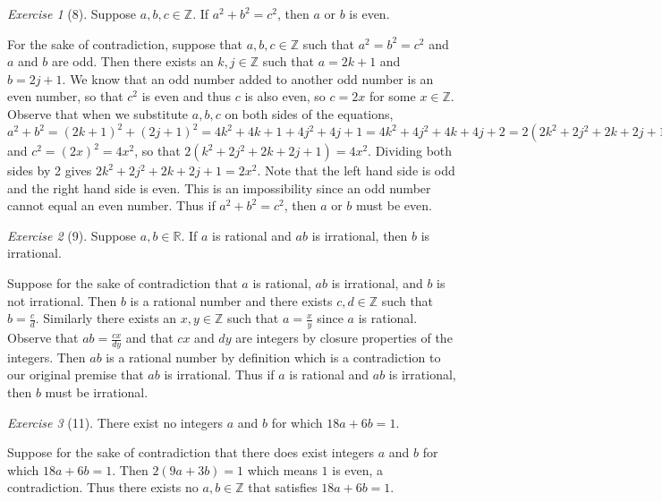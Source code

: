\documentclass[12pt]{amsart}
\makeatletter
\theoremstyle{remark}
\newtheorem*{exercise}{Exercise}%
\def\RR{\ensuremath{\mathbb R}}
\def\ZZ{\ensuremath{\mathbb Z}}
\renewenvironment{proof}[1][\proofname]{\par\doublespacing
  \pushQED{\qed}%
  \normalfont \topsep6\p@\@plus6\p@\relax
  \list{}{%
    \settowidth{\leftmargin}{\itshape\proofname:\hskip\labelsep}%
    \setlength{\labelwidth}{0pt}%
    \setlength{\itemindent}{-\leftmargin}%
  }%
  \item[\hskip\labelsep\itshape#1\@addpunct{:}]\ignorespaces
}{%
  \popQED\endlist\@endpefalse
  \singlespacing
}
\theoremstyle{mycomment}
\makeatother
\begin{document}
\begin{exercise}[8] Suppose $a,b,c\in\ZZ$. If $a^{2}+b^{2}=c^{2}$, then $a$ or $b$ is even.
\begin{proof}
For the sake of contradiction, suppose that $a,b,c\in\ZZ$ such that $a^2=b^2=c^2$ and $a$ and $b$ are odd. Then there exists an $k,j\in\ZZ$ such that $a = 2k + 1$ and $b = 2j+1$. We know that an odd number added to another odd number is an even number, so that $c^2$ is even and thus $c$ is also even, so $c = 2x$ for some $x\in\ZZ$. Observe that when we substitute $a,b,c$ on both sides of the equations, $a^2 + b^2 = (2k+1)^2 + (2j+1)^2 = 4k^2 + 4k + 1 + 4j^2 + 4j + 1 = 4k^2 + 4j^2 + 4k + 4j + 2 = 2(2k^2 + 2j^2 + 2k + 2j + 1)$ and $c^2 = (2x)^2 = 4x^2$, so that $2(k^2 + 2j^2 + 2k + 2j + 1) = 4x^2$. Dividing both sides by 2 gives $2k^2 + 2j^2 + 2k + 2j + 1 = 2x^2$. Note that the left hand side is odd and the right hand side is even. This is an impossibility since an odd number cannot equal an even number. Thus if $a^2 + b^2=c^2$, then $a$ or $b$ must be even.
\end{proof}
\end{exercise}

\begin{exercise}[9] Suppose $a,b\in\RR$. If $a$ is rational and $ab$ is irrational, then $b$ is irrational.
\begin{proof}
  Suppose for the sake of contradiction that $a$ is rational, $ab$ is irrational, and $b$ is not irrational. Then $b$ is a rational number and there exists $c,d \in \ZZ$ such that $b = \frac{c}{d}$. Similarly there exists an $x,y \in \ZZ$ such that $a = \frac{x}{y}$ since $a$ is rational. Observe that $ab = \frac{cx}{dy}$ and that $cx$ and $dy$ are integers by closure properties of the integers. Then $ab$ is a rational number by definition which
  is a contradiction to our original premise that $ab$ is irrational. Thus if $a$ is rational and $ab$ is irrational, then $b$ must be irrational.
\end{proof}
\end{exercise}

\begin{exercise}[11] There exist no integers $a$ and $b$ for which $18a+6b=1$.
\begin{proof}
Suppose for the sake of contradiction that there does exist integers $a$ and $b$ for which $18a + 6b = 1$.
Then $2(9a + 3b) = 1$ which means $1$ is even, a contradiction. Thus there exists no $a,b\in\ZZ$ that satisfies $18a + 6b = 1$.
\end{proof}
\end{exercise}
\end{document}
